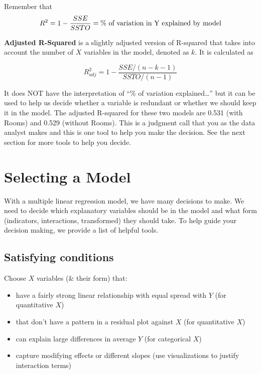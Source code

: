 \documentclass[
]{book}
\providecommand{\tightlist}{%
  \setlength{\itemsep}{0pt}\setlength{\parskip}{0pt}}
\begin{document}
Remember that
\[R^2 = 1 - \frac{SSE}{SSTO} = \%\hbox{ of variation in Y explained by model}\]

\textbf{Adjusted R-Squared} is a slightly adjusted version of R-squared that takes into account the number of \(X\) variables in the model, denoted as \(k\). It is calculated as

\[R^2_{adj} = 1 - \frac{SSE/(n-k-1)}{SSTO/(n-1)}\]

It does NOT have the interpretation of ``\% of variation explained\ldots{}'' but it can be used to help us decide whether a variable is redundant or whether we should keep it in the model. The adjusted R-squared for these two models are 0.531 (with Rooms) and 0.529 (without Rooms). This is a judgment call that you as the data analyst makes and this is one tool to help you make the decision. See the next section for more tools to help you decide.

\hypertarget{selecting-a-model}{%
\section{Selecting a Model}\label{selecting-a-model}}

With a multiple linear regression model, we have many decisions to make. We need to decide which explanatory variables should be in the model and what form (indicators, interactions, transformed) they should take. To help guide your decision making, we provide a list of helpful tools.

\hypertarget{satisfying-conditions}{%
\subsection{Satisfying conditions}\label{satisfying-conditions}}

Choose \(X\) variables (\& their form) that:

\begin{itemize}
\tightlist
\item
  have a fairly strong linear relationship with equal spread with \(Y\) (for quantitative \(X\))
\item
  that don't have a pattern in a residual plot against \(X\) (for quantitative \(X\))
\item
  can explain large differences in average \(Y\) (for categorical \(X\))
\item
  capture modifying effects or different slopes (use visualizations to justify interaction terms)
\end{itemize}
\end{document}
